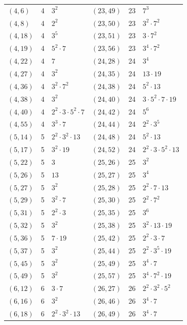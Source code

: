 \documentclass[11pt]{article}
\begin{document}
\begin{longtable}{@{}lrl@{\qquad}lrl@{}}
$(4,6)$ & 4 & $3^{2}$ & $(23,49)$ & 23 & $7^{3}$\\
$(4,8)$ & 4 & $2^{2}$ & $(23,50)$ & 23 & $3^{2}\cdot 7^{2}$\\
$(4,18)$ & 4 & $3^{5}$ & $(23,51)$ & 23 & $3\cdot 7^{2}$\\
$(4,19)$ & 4 & $5^{2}\cdot 7$ & $(23,56)$ & 23 & $3^{4}\cdot 7^{2}$\\
$(4,22)$ & 4 & $7$ & $(24,28)$ & 24 & $3^{4}$\\
$(4,27)$ & 4 & $3^{2}$ & $(24,35)$ & 24 & $13\cdot 19$\\
$(4,36)$ & 4 & $3^{2}\cdot 7^{2}$ & $(24,38)$ & 24 & $5^{2}\cdot 13$\\
$(4,38)$ & 4 & $3^{2}$ & $(24,40)$ & 24 & $3\cdot 5^{2}\cdot 7\cdot 19$\\
$(4,40)$ & 4 & $2^{2}\cdot 3\cdot 5^{2}\cdot 7$ & $(24,42)$ & 24 & $5^{6}$\\
$(4,55)$ & 4 & $3^{3}\cdot 7$ & $(24,44)$ & 24 & $2^{2}\cdot 3^{5}$\\
$(5,14)$ & 5 & $2^{2}\cdot 3^{2}\cdot 13$ & $(24,48)$ & 24 & $5^{2}\cdot 13$\\
$(5,17)$ & 5 & $3^{2}\cdot 19$ & $(24,52)$ & 24 & $2^{2}\cdot 3\cdot 5^{2}\cdot 13$\\
$(5,22)$ & 5 & $3$ & $(25,26)$ & 25 & $3^{2}$\\
$(5,26)$ & 5 & $13$ & $(25,27)$ & 25 & $3^{4}$\\
$(5,27)$ & 5 & $3^{2}$ & $(25,28)$ & 25 & $2^{2}\cdot 7\cdot 13$\\
$(5,29)$ & 5 & $3^{2}\cdot 7$ & $(25,30)$ & 25 & $2^{2}\cdot 7^{2}$\\
$(5,31)$ & 5 & $2^{2}\cdot 3$ & $(25,35)$ & 25 & $3^{6}$\\
$(5,32)$ & 5 & $3^{2}$ & $(25,38)$ & 25 & $3^{2}\cdot 13\cdot 19$\\
$(5,36)$ & 5 & $7\cdot 19$ & $(25,42)$ & 25 & $2^{2}\cdot 3\cdot 7$\\
$(5,37)$ & 5 & $3^{2}$ & $(25,44)$ & 25 & $2^{2}\cdot 3^{5}\cdot 19$\\
$(5,45)$ & 5 & $3^{2}$ & $(25,49)$ & 25 & $3^{4}\cdot 7$\\
$(5,49)$ & 5 & $3^{2}$ & $(25,57)$ & 25 & $3^{4}\cdot 7^{2}\cdot 19$\\
$(6,12)$ & 6 & $3\cdot 7$ & $(26,27)$ & 26 & $2^{2}\cdot 3^{2}\cdot 5^{2}$\\
$(6,16)$ & 6 & $3^{2}$ & $(26,46)$ & 26 & $3^{4}\cdot 7$\\
$(6,18)$ & 6 & $2^{2}\cdot 3^{2}\cdot 13$ & $(26,49)$ & 26 & $3^{4}\cdot 7$\\

\end{longtable}
\end{document}
